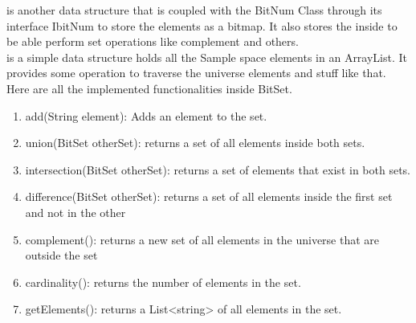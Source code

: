 \documentclass[11pt]{article}
\begin{document}
 is another data structure that is coupled with the BitNum Class through its interface IbitNum to store the elements as a bitmap. It also stores the  inside to be able perform set operations like complement and others. \\

 is a simple data structure holds all the Sample space elements in an ArrayList. It provides some operation to traverse the universe elements and stuff like that. Here are all the implemented functionalities inside BitSet. \\

\begin{enumerate}
  \item add(String element): Adds an element to the set.
  \item union(BitSet otherSet): returns a set of all elements inside both sets.
  \item intersection(BitSet otherSet): returns a set of elements that exist in both sets.
  \item difference(BitSet otherSet): returns a set of all elements inside the first set and not in the other
  \item complement(): returns a new set of all elements in the universe that are outside the set
  \item cardinality(): returns the number of elements in the set.
  \item getElements(): returns a List<string> of all elements in the set.
\end{enumerate}

\newpage
{}
\clearpage
{}

\vfill
\huge
\centering
{}
\vfill
\end{document}
